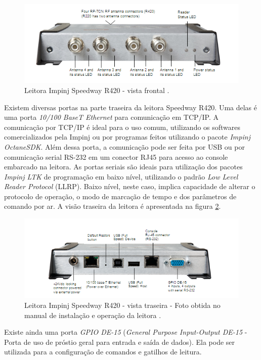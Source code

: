      \begin{figure}[H]
        \centering
        \includegraphics[width=0.6\linewidth]{figs/Metodologia/SpeedwayR420-front-view.png}
        \caption{Leitora Impinj Speedway R420 - vista frontal \cite{SpeedwayRUserManual}.}
        \label{fig:SpeedwayR420front}
    \end{figure}
 
 Existem diversas portas na parte traseira da leitora Speedway R420. Uma delas é uma porta \textit{10/100 BaseT Ethernet} para comunicação em TCP/IP. A comunicação por TCP/IP é ideal para o uso comum, utilizando os softwares comercializados pela Impinj ou por programas feitos utilizando o pacote \textit{Impinj OctaneSDK}. Além dessa porta, a comunicação pode ser feita por USB ou por comunicação serial RS-232 em um conector RJ45 para acesso ao console embarcado na leitora. As portas seriais são ideais para utilização dos pacotes \textit{Impinj LTK} de programação em baixo nível, utilizando o padrão \textit{Low Level Reader Protocol} (LLRP). Baixo nível, neste caso, implica capacidade de alterar o protocolo de operação, o modo de marcação de tempo e dos parâmetros de comando por ar\cite{GS1-LLRP}\cite{SpeedwayRUserManual}. A visão traseira da leitora é apresentada na figura \ref{fig:SpeedwayR420back}.
 
\begin{figure}[H]
    \centering
    \includegraphics[width=0.6\linewidth]{figs/Metodologia/SpeedwayR420-back-view.png}
    \caption{Leitora Impinj Speedway R420 - vista traseira - Foto obtida no manual de instalação e operação da leitora \cite{SpeedwayRUserManual}.}
    \label{fig:SpeedwayR420back}
\end{figure}
 
 Existe ainda uma porta \textit{GPIO DE-15} (\textit{General Purpose Input-Output DE-15} - Porta de uso de próstio geral para entrada e saída de dados)\cite{SpeedwayRUserManual}. Ela pode ser utilizada para a configuração de comandos e gatilhos de leitura.
 
